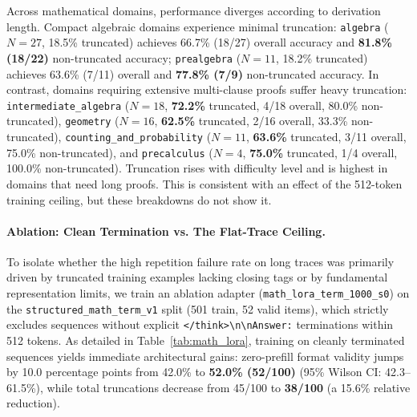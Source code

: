 \documentclass[11pt,a4paper]{article}
\begin{document}
Across mathematical domains, performance diverges according to derivation length. Compact algebraic domains experience minimal truncation: \texttt{algebra} ($N=27$, 18.5\% truncated) achieves 66.7\% (18/27) overall accuracy and \textbf{81.8\% (18/22)} non-truncated accuracy; \texttt{prealgebra} ($N=11$, 18.2\% truncated) achieves 63.6\% (7/11) overall and \textbf{77.8\% (7/9)} non-truncated accuracy. In contrast, domains requiring extensive multi-clause proofs suffer heavy truncation: \texttt{intermediate\_algebra} ($N=18$, \textbf{72.2\%} truncated, 4/18 overall, 80.0\% non-truncated), \texttt{geometry} ($N=16$, \textbf{62.5\%} truncated, 2/16 overall, 33.3\% non-truncated), \texttt{counting\_and\_probability} ($N=11$, \textbf{63.6\%} truncated, 3/11 overall, 75.0\% non-truncated), and \texttt{precalculus} ($N=4$, \textbf{75.0\%} truncated, 1/4 overall, 100.0\% non-truncated). Truncation rises with difficulty level and is highest in domains that need long proofs. This is consistent with an effect of the 512-token training ceiling, but these breakdowns do not show it.

\paragraph{Ablation: Clean Termination vs. The Flat-Trace Ceiling.}
To isolate whether the high repetition failure rate on long traces was primarily driven by truncated training examples lacking closing tags or by fundamental representation limits, we train an ablation adapter (\texttt{math\_lora\_term\_1000\_s0}) on the \texttt{structured\_math\_term\_v1} split (501 train, 52 valid items), which strictly excludes sequences without explicit \texttt{</think>\textbackslash{}n\textbackslash{}nAnswer:} terminations within 512 tokens. As detailed in Table~\ref{tab:math_lora}, training on cleanly terminated sequences yields immediate architectural gains: zero-prefill format validity jumps by 10.0 percentage points from 42.0\% to \textbf{52.0\% (52/100)} (95\% Wilson CI: 42.3--61.5\%), while total truncations decrease from 45/100 to \textbf{38/100} (a 15.6\% relative reduction).
\end{document}
